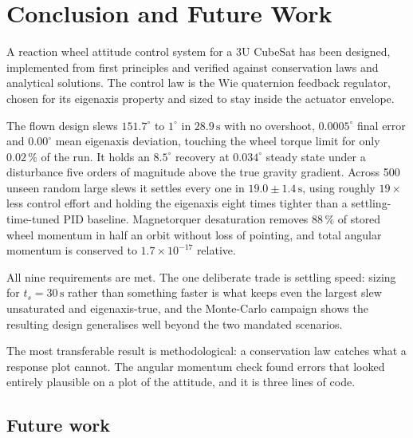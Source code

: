 \documentclass[conference,10pt,a4paper]{IEEEtran}
\newcommand{\unit}[1]{\ensuremath{\,\mathrm{#1}}}
\begin{document}
\section{Conclusion and Future Work}
\label{sec:conclusion}

A reaction wheel attitude control system for a 3U CubeSat has been designed,
implemented from first principles and verified against conservation laws and
analytical solutions. The control law is the Wie quaternion feedback regulator,
chosen for its eigenaxis property and sized to stay inside the actuator
envelope.

The flown design slews $151.7^\circ$ to $1^\circ$ in $28.9\unit{s}$ with no
overshoot, $0.0005^\circ$ final error and $0.00^\circ$ mean eigenaxis
deviation, touching the wheel torque limit for only $0.02\,\%$ of the run. It
holds an $8.5^\circ$ recovery at $0.034^\circ$ steady state under a disturbance
five orders of magnitude above the true gravity gradient. Across 500 unseen
random large slews it settles every one in $19.0\pm1.4\unit{s}$, using roughly
$19\times$ less control effort and holding the eigenaxis eight times tighter
than a settling-time-tuned PID baseline. Magnetorquer desaturation removes
$88\,\%$ of stored wheel momentum in half an orbit without loss of pointing,
and total angular momentum is conserved to $1.7\times10^{-17}$ relative.

All nine requirements are met. The one deliberate trade is settling speed:
sizing for $t_s=30\unit{s}$ rather than something faster is what keeps even the
largest slew unsaturated and eigenaxis-true, and the Monte-Carlo campaign shows
the resulting design generalises well beyond the two mandated scenarios.

The most transferable result is methodological: a conservation law catches what
a response plot cannot. The angular momentum check found errors that looked
entirely plausible on a plot of the attitude, and it is three lines of code.

\subsection{Future work}
\label{sec:future}
\end{document}
